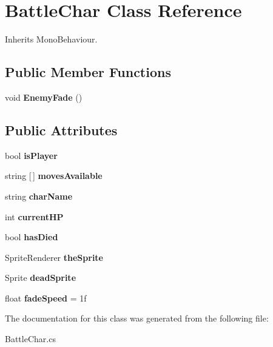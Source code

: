 \hypertarget{class_battle_char}{}\section{Battle\+Char Class Reference}
\label{class_battle_char}


Inherits Mono\+Behaviour.

\subsection*{Public Member Functions}
\begin{DoxyCompactItemize}
\item 
\mbox{\label{class_battle_char_a8e807cac86da06838b799b482d0b4b64}} 
void {\bfseries Enemy\+Fade} ()
\end{DoxyCompactItemize}
\subsection*{Public Attributes}
\begin{DoxyCompactItemize}
\item 
\mbox{\label{class_battle_char_a83d606d2aa88ddb258314b74f4361103}} 
bool {\bfseries is\+Player}
\item 
\mbox{\label{class_battle_char_a7650f64bd0b0971d0f439341899b2d57}} 
string \mbox{[}$\,$\mbox{]} {\bfseries moves\+Available}
\item 
\mbox{\label{class_battle_char_a351efa3acb3cdc63a801b4620e51f8c6}} 
string {\bfseries char\+Name}
\item 
\mbox{\label{class_battle_char_a6b388d4dd21e462d43fb286c223a1a2b}} 
int {\bfseries current\+HP}
\item 
\mbox{\label{class_battle_char_a531f305e2fc942dc9983730540fc3779}} 
bool {\bfseries has\+Died}
\item 
\mbox{\label{class_battle_char_a7ce6146401186f4bc371aa97ba2b0a8b}} 
Sprite\+Renderer {\bfseries the\+Sprite}
\item 
\mbox{\label{class_battle_char_a9ee2956eb7ad84b3fa907d66d9822e57}} 
Sprite {\bfseries dead\+Sprite}
\item 
\mbox{\label{class_battle_char_a4b49f6339fc6fce54b704ea28f6c9161}} 
float {\bfseries fade\+Speed} = 1f
\end{DoxyCompactItemize}


The documentation for this class was generated from the following file\+:\begin{DoxyCompactItemize}
\item 
Battle\+Char.\+cs\end{DoxyCompactItemize}
